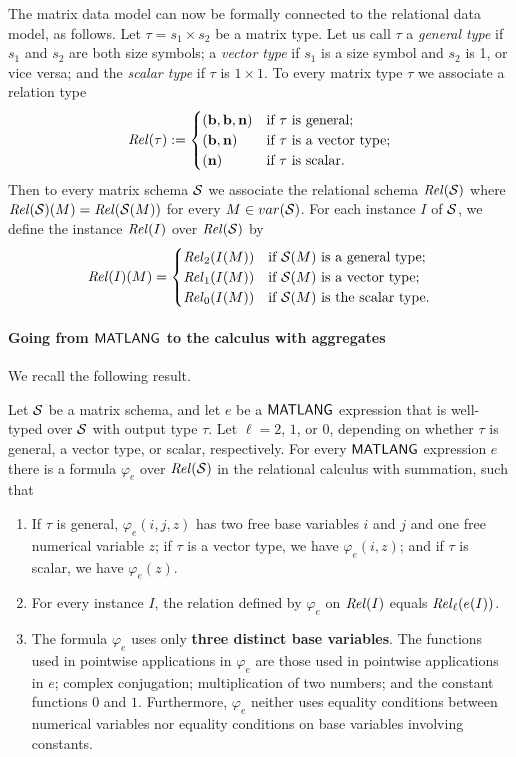 The matrix data model can now be formally connected to the relational data
model, as follows. Let $\tau = s_1\times s_2$ be a matrix type.  Let us call $\tau$ a
\emph{general type} if $s_1$ and $s_2$ are both size symbols; a
\emph{vector type} if $s_1$ is a size symbol and $s_2$ is 1, or
vice versa; and the \emph{scalar type} if $\tau$ is $1\times 1$.
To every matrix type $\tau$ we associate a relation type
$$ \mathit{Rel}(\tau) := \begin{cases}
(\mathbf{b},\mathbf{b},\mathbf{n}) & \text{if $\tau$ is general;} \\
(\mathbf{b},\mathbf{n}) & \text{if $\tau$ is a vector type;} \\
(\mathbf{n}) & \text{if $\tau$ is scalar.} \end{cases} $$
Then to every matrix schema $\mathcal{S}$ we associate the relational
schema $\mathit{Rel}(\mathcal{S})$ where $\mathit{Rel}(\mathcal{S})(M) = \mathit{Rel}(\mathcal{S}(M))$ for
every $M \in var(\mathcal{S})$.  For each instance $I$ of
$\mathcal{S}$, we define the instance $\mathit{Rel}(I)$ over
$\mathit{Rel}(\mathcal{S})$ by $$ \mathit{Rel}(I)(M) = \begin{cases} 
\mathit{Rel}_2(I(M)) & \text{if $\mathcal{S}(M)$ is a general type;} \\
\mathit{Rel}_1(I(M)) & \text{if $\mathcal{S}(M)$ is a vector type;} \\
\mathit{Rel}_0(I(M)) & \text{if $\mathcal{S}(M)$ is the scalar type.}
\end{cases} $$  

\paragraph{Going from $\mathsf{MATLANG}$ to the calculus with aggregates}
We recall the following result.
\begin{proposition} 
Let $\mathcal{S}$ be a matrix schema, and let $e$ be a $\mathsf{MATLANG}$ expression
that is well-typed over $\mathcal{S}$ with output type $\tau$.
Let $\ell=2$, $1$,
or $0$, depending on whether $\tau$ is general, a vector type, or
scalar, respectively.
For every $\mathsf{MATLANG}$ expression $e$ there is a formula
$\varphi_e$ over $\mathit{Rel}(\mathcal{S})$
in the relational calculus with summation, such that
\begin{enumerate}
\item
If\/ $\tau$ is general, $\varphi_e(i,j,z)$ has two free base
variables $i$ and $j$ and one free numerical variable $z$; if\/
$\tau$ is a vector type, we have $\varphi_e(i,z)$; and if\/ $\tau$ is
scalar, we have $\varphi_e(z)$.
\item
For every instance $I$, the relation defined by $\varphi_e$ on
$\mathit{Rel}(I)$ equals $\mathit{Rel}_\ell(e(I))$.
\item
The formula $\varphi_e$ uses only {\bf three distinct base variables}. The functions used in pointwise applications in $\varphi_e$ 
 are those used in
pointwise applications in $e$; complex conjugation;
multiplication of two numbers;
and the constant functions $0$ and $1$.
 Furthermore, $\varphi_e$ neither uses equality conditions between numerical variables nor equality conditions on base variables involving constants.
\end{enumerate}
\end{proposition}

